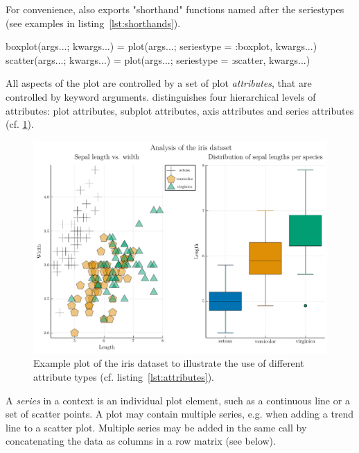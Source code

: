 For convenience, \Plots also exports "shorthand" functions named after the seriestypes (see examples in listing~\ref{lst:shorthands}).
\pagebreak
%
\begin{code}[caption=Examples of shorthands. Full list available at \url{https://docs.juliaplots/stable/api/\#Plot-specification}., label=lst:shorthands]
boxplot(args...; kwargs...) = plot(args...; seriestype = :boxplot, kwargs...)
scatter(args...; kwargs...) = plot(args...; seriestype = :scatter, kwargs...)
\end{code}

All aspects of the plot are controlled by a set of plot \emph{attributes}, that are controlled by keyword arguments\cite{OverviewPlots}.
\Plots distinguishes four hierarchical levels of attributes: plot attributes, subplot attributes, axis attributes and series attributes (cf. \cref{fig:attributes}).

\begin{figure}
    \centering
    \includegraphics[width=\linewidth]{./fig/attributes}
    \caption{Example plot of the iris dataset\cite{UCIMachineLearning} to illustrate the use of different attribute types (cf. listing~\ref{lst:attributes}).}
    \label{fig:attributes}
\end{figure}
%

A \emph{series} in a \Plots context is an individual plot element, such as a continuous line or a set of scatter points.
A plot may contain multiple series, e.g. when adding a trend line to a scatter plot.
Multiple series may be added in the same  call by concatenating the data as columns in a row matrix (see below).

